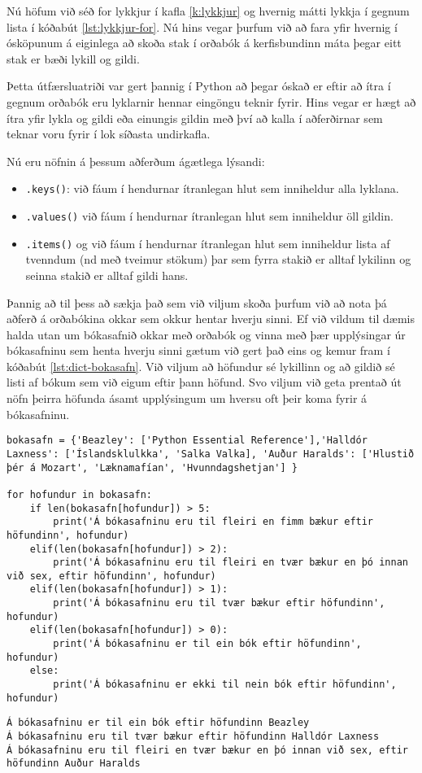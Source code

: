 Nú höfum við séð for lykkjur í kafla \ref{k:lykkjur} og hvernig mátti lykkja í gegnum lista í kóðabút \ref{lst:lykkjur-for}.
Nú hins vegar þurfum við að fara yfir hvernig í ósköpunum á eiginlega að skoða stak í orðabók á kerfisbundinn máta þegar eitt stak er bæði lykill og gildi.

Þetta útfærsluatriði var gert þannig í Python að þegar óskað er eftir að ítra í gegnum orðabók eru lyklarnir hennar eingöngu teknir fyrir.
Hins vegar er hægt að ítra yfir lykla og gildi eða einungis gildin með því að kalla í aðferðirnar sem teknar voru fyrir í lok síðasta undirkafla.

Nú eru nöfnin á þessum aðferðum ágætlega lýsandi:

\begin{itemize}
	\item \texttt{.keys()}: við fáum í hendurnar ítranlegan hlut sem inniheldur alla lyklana.
	\item \texttt{.values()} við fáum í hendurnar ítranlegan hlut sem inniheldur öll gildin.
	\item \texttt{.items()} og  við fáum í hendurnar ítranlegan hlut sem inniheldur lista af tvenndum (nd með tveimur stökum) þar sem fyrra stakið er alltaf lykilinn og seinna stakið er alltaf gildi hans.
\end{itemize}

Þannig að til þess að sækja það sem við viljum skoða þurfum við að nota þá aðferð á orðabókina okkar sem okkur hentar hverju sinni.
Ef við vildum til dæmis halda utan um bókasafnið okkar með orðabók og vinna með þær upplýsingar úr bókasafninu sem henta hverju sinni gætum við gert það eins og kemur fram í kóðabút \ref{lst:dict-bokasafn}.
Við viljum að höfundur sé lykillinn og að gildið sé listi af bókum sem við eigum eftir þann höfund.
Svo viljum við geta prentað út nöfn þeirra höfunda ásamt upplýsingum um hversu oft þeir koma fyrir á bókasafninu.

\begin{lstlisting}[caption=Skoðum hvernig megi ítra í gegnum orðabækur, label=lst:dict-bokasafn]
bokasafn = {'Beazley': ['Python Essential Reference'],'Halldór Laxness': ['Íslandsklulkka', 'Salka Valka], 'Auður Haralds': ['Hlustið þér á Mozart', 'Læknamafían', 'Hvunndagshetjan'] }

for hofundur in bokasafn:
	if len(bokasafn[hofundur]) > 5:
		print('Á bókasafninu eru til fleiri en fimm bækur eftir höfundinn', hofundur)
	elif(len(bokasafn[hofundur]) > 2):
		print('Á bókasafninu eru til fleiri en tvær bækur en þó innan við sex, eftir höfundinn', hofundur)
	elif(len(bokasafn[hofundur]) > 1):
		print('Á bókasafninu eru til tvær bækur eftir höfundinn', hofundur)
	elif(len(bokasafn[hofundur]) > 0):
		print('Á bókasafninu er til ein bók eftir höfundinn', hofundur)
	else:
		print('Á bókasafninu er ekki til nein bók eftir höfundinn', hofundur)
\end{lstlisting}
\lstset{style=uttak}
\begin{lstlisting}
Á bókasafninu er til ein bók eftir höfundinn Beazley
Á bókasafninu eru til tvær bækur eftir höfundinn Halldór Laxness
Á bókasafninu eru til fleiri en tvær bækur en þó innan við sex, eftir höfundinn Auður Haralds
\end{lstlisting}
\lstset{style=venjulegt}

